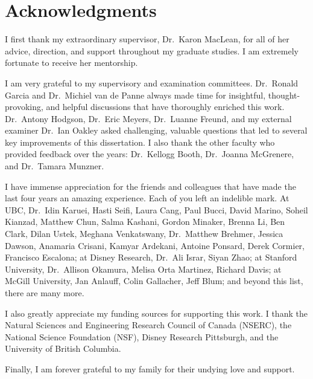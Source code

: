 
\chapter{Acknowledgments}

I first thank my extraordinary supervisor, Dr.~Karon MacLean, for all of her advice, direction, and support throughout my graduate studies.
I am extremely fortunate to receive her mentorship.

I am very grateful to my supervisory and examination committees. Dr.~Ronald Garcia and Dr.~Michiel van de Panne always made time for insightful, thought-provoking, and helpful discussions that have thoroughly enriched this work.
Dr.~Antony Hodgson, Dr.~Eric Meyers, Dr.~Luanne Freund, and my external examiner Dr.~Ian Oakley asked challenging, valuable questions that led to several key improvements of this dissertation.
I also thank the other faculty who provided feedback over the years: Dr.~Kellogg Booth, Dr.~Joanna McGrenere, and Dr.~Tamara Munzner.

I have immense appreciation for the friends and colleagues that have made the last four years an amazing experience.
Each of you left an indelible mark.
At UBC, Dr.~Idin Karuei, Hasti Seifi, Laura Cang, Paul Bucci,  David Marino, Soheil Kianzad, Matthew Chun, Salma Kashani, Gordon Minaker, Brenna Li,  Ben Clark, Dilan Ustek, Meghana Venkatswany, Dr.~Matthew Brehmer, Jessica Dawson, Anamaria Crisani, Kamyar Ardekani, Antoine Ponsard, Derek Cormier, Francisco Escalona;
at Disney Research, Dr.~Ali Israr, Siyan Zhao; 
at Stanford University, Dr.~Allison Okamura, Melisa Orta Martinez, Richard Davis;
at McGill University, Jan Anlauff, Colin Gallacher, Jeff Blum;
and beyond this list, there are many more.

I also greatly appreciate my funding sources for supporting this work.
I thank the Natural Sciences and Engineering Research Council of Canada (NSERC), the National Science Foundation (NSF), Disney Research Pittsburgh, and the University of British Columbia.

Finally, I am forever grateful to my family for their undying love and support.
